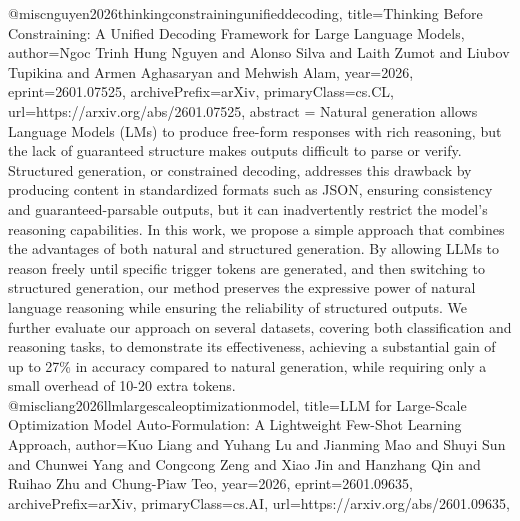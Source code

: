 {}@misc{nguyen2026thinkingconstrainingunifieddecoding,
      title={Thinking Before Constraining: A Unified Decoding Framework for Large Language Models}, 
      author={Ngoc Trinh Hung Nguyen and Alonso Silva and Laith Zumot and Liubov Tupikina and Armen Aghasaryan and Mehwish Alam},
      year={2026},
      eprint={2601.07525},
      archivePrefix={arXiv},
      primaryClass={cs.CL},
      url={https://arxiv.org/abs/2601.07525},
      abstract = {Natural generation allows Language Models (LMs) to produce free-form responses with rich reasoning, but the lack of guaranteed structure makes outputs difficult to parse or verify. Structured generation, or constrained decoding, addresses this drawback by producing content in standardized formats such as JSON, ensuring consistency and guaranteed-parsable outputs, but it can inadvertently restrict the model's reasoning capabilities. In this work, we propose a simple approach that combines the advantages of both natural and structured generation. By allowing LLMs to reason freely until specific trigger tokens are generated, and then switching to structured generation, our method preserves the expressive power of natural language reasoning while ensuring the reliability of structured outputs. We further evaluate our approach on several datasets, covering both classification and reasoning tasks, to demonstrate its effectiveness, achieving a substantial gain of up to 27\% in accuracy compared to natural generation, while requiring only a small overhead of 10-20 extra tokens.}
}@misc{liang2026llmlargescaleoptimizationmodel,
      title={LLM for Large-Scale Optimization Model Auto-Formulation: A Lightweight Few-Shot Learning Approach}, 
      author={Kuo Liang and Yuhang Lu and Jianming Mao and Shuyi Sun and Chunwei Yang and Congcong Zeng and Xiao Jin and Hanzhang Qin and Ruihao Zhu and Chung-Piaw Teo},
      year={2026},
      eprint={2601.09635},
      archivePrefix={arXiv},
      primaryClass={cs.AI},
      url={https://arxiv.org/abs/2601.09635},
}
